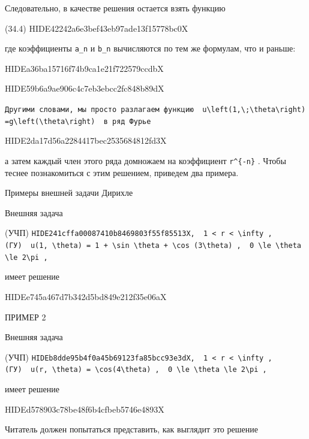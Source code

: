 \documentclass[
  ukrainian,
]{article}
\begin{document}
Следовательно, в качестве решения остается взять функцию

(34.4) HIDE42242a6e3bef43eb97ade13f15778bc0X

где коэффициенты \texttt{a\_n} и \texttt{b\_n} вычисляются по тем же
формулам, что и раньше:

HIDEa36ba15716f74b9ca1e21f722579ccdbX

HIDE59b6a9ae906c4c7eb3ebcc2fc848b89dX

\texttt{Другими\ словами,\ мы\ просто\ разлагаем\ функцию\ \ \textquotesingle{}u\textbackslash{}left(1,\textbackslash{};\textbackslash{}theta\textbackslash{}right)=g\textbackslash{}left(\textbackslash{}theta\textbackslash{}right)\textquotesingle{}\ \ в\ ряд\ Фурье}

HIDE2da17d56a2284417bec2535684812fd3X

а затем каждый член этого ряда домножаем на коэффициент
\texttt{r\^{}\{-n\}} . Чтобы теснее познакомиться с этим решением,
приведем два примера.

Примеры внешней задачи Дирихле

Внешняя задача

(УЧП)
\texttt{HIDE241cffa00087410b8469803f55f85513X,\ \ \textquotesingle{}1\ \textless{}\ r\ \textless{}\ \textbackslash{}infty\textquotesingle{}\ ,}
\texttt{(ГУ)\ \ \textquotesingle{}u(1,\ \textbackslash{}theta)\ =\ 1\ +\ \textbackslash{}sin\ \textbackslash{}theta\ +\ \textbackslash{}cos\ (3\textbackslash{}theta)\textquotesingle{}\ ,\ \ \textquotesingle{}0\ \textbackslash{}le\ \textbackslash{}theta\ \textbackslash{}le\ 2\textbackslash{}pi\textquotesingle{}\ ,}

имеет решение

HIDEe745a467d7b342d5bd849e212f35e06aX

ПРИМЕР 2

Внешняя задача

(УЧП)
\texttt{HIDEb8dde95b4f0a45b69123fa85bcc93e3dX,\ \ \textquotesingle{}1\ \textless{}\ r\ \textless{}\ \textbackslash{}infty\textquotesingle{}\ ,}
\texttt{(ГУ)\ \ \textquotesingle{}u(r,\ \textbackslash{}theta)\ =\ \textbackslash{}cos(4\textbackslash{}theta)\textquotesingle{}\ ,\ \ \textquotesingle{}0\ \textbackslash{}le\ \textbackslash{}theta\ \textbackslash{}le\ 2\textbackslash{}pi\textquotesingle{}\ ,}

имеет решение

HIDEd578903c78be48f6b4cfbeb5746e4893X

Читатель должен попытаться представить, как выглядит это решение
\end{document}
